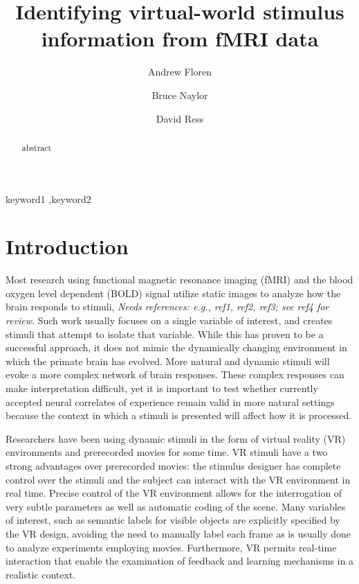 \documentclass[preprint,5p,authoryear]{elsarticle}
\begin{document}
\begin{frontmatter}

\title{Identifying virtual-world stimulus information from fMRI data}

\author[UT]{Andrew Floren}

\author[UT]{Bruce Naylor}

\author[UT]{David Ress}

\address[UT]{The University of Texas at Austin, Austin, TX 78712 USA}


\begin{abstract}
abstract
\end{abstract}

\begin{keyword}
keyword1 \sep keyword2
\end{keyword}

\end{frontmatter}

\section{Introduction}
Most research using functional magnetic resonance imaging (fMRI) and the blood oxygen level dependent (BOLD) signal utilize static images to analyze how the brain responds to stimuli, \emph{Needs references: e.g., ref1, ref2, ref3; see ref4 for review}.
Such work usually focuses on a single variable of interest, and creates stimuli that attempt to isolate that variable.
While this has proven to be a successful approach, it does not mimic the dynamically changing environment in which the primate brain has evolved.
More natural and dynamic stimuli will evoke a more complex network of brain responses.
These complex responses can make interpretation difficult, yet it is important to test whether currently accepted neural correlates of experience remain valid in more natural settings because the context in which a stimuli is presented will affect how it is processed.

Researchers have been using dynamic stimuli in the form of virtual reality (VR) environments \citep{Maguire1998,Calhoun2002,King2006,Mathiak2006,Spiers2007a,Hassabis2009} and prerecorded movies \citep{Hasson2004,Chadwick2010,Nishimoto2011} for some time.
VR stimuli have a two strong advantages over prerecorded movies: the stimulus designer has complete control over the stimuli and the subject can interact with the VR environment in real time.
Precise control of the VR environment allows for the interrogation of very subtle parameters as well as automatic coding of the scene.
Many variables of interest, such as semantic labels for visible objects are explicitly specified by the VR design, avoiding the need to manually label each frame as is usually done to analyze experiments employing movies.
Furthermore, VR permits real-time interaction that enable the examination of feedback and learning mechanisms in a realistic context.
\end{document}
